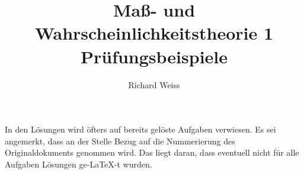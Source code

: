 \documentclass{article}
\title
{
  Maß- und Wahrscheinlichkeitstheorie 1 \\
  Prüfungsbeispiele
}
\author
{
  Richard Weiss
}
\date{}
\begin{document}
\maketitle

In den Lösungen wird öfters auf bereits gelöste Aufgaben verwiesen. Es sei angemerkt, dass an der Stelle Bezug auf die Nummerierung des Originaldokuments genommen wird. Das liegt daran, dass eventuell nicht für alle Aufgaben Lösungen ge-\LaTeX-t wurden.


\end{document}
